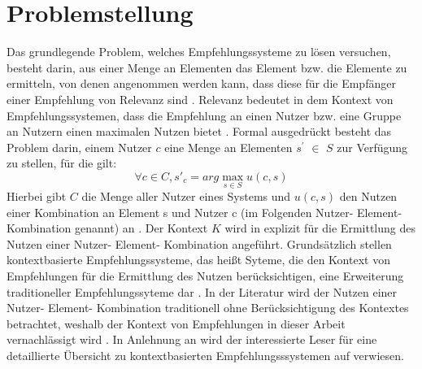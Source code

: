 \section{Problemstellung}
\label{ch:empfehlungssysteme:problemstellung}
Das grundlegende Problem, welches Empfehlungssysteme zu lösen versuchen, besteht darin, aus einer Menge an Elementen das Element bzw. die Elemente zu ermitteln, von denen angenommen werden kann, dass diese für die Empfänger einer Empfehlung von Relevanz sind \cite[S. 734f]{adomavicius:inproceedings}\cite[S. 76]{jannach:inproceedings}.
Relevanz bedeutet in dem Kontext von Empfehlungssystemen, dass die Empfehlung an einen Nutzer bzw. eine Gruppe an Nutzern einen maximalen Nutzen bietet \cite[S. 49]{adomavicius:inproceedings:2}\cite[S. 219]{lakiotaki:inproceedings}.
Formal ausgedrückt besteht das Problem darin, einem Nutzer $c$ eine Menge an Elementen $s^{'}$ $\in$ $S$ zur Verfügung zu stellen, für die gilt:
\begin{equation}\label{eq1}
    \forall c\in C,  s'_c = arg\max_{s \in S} u(c,s)
\end{equation}
Hierbei gibt $C$ die Menge aller Nutzer eines Systems und $u(c,s)$ den Nutzen einer Kombination an Element s und Nutzer c (im Folgenden Nutzer- Element- Kombination genannt) an \cite[S. 734f]{adomavicius:inproceedings}\cite[S. 219]{lakiotaki:inproceedings}.
Der Kontext $K$ wird in \textcite[S. 1]{klahold:book} explizit für die Ermittlung des Nutzen einer Nutzer- Element- Kombination angeführt.
Grundsätzlich stellen kontextbasierte Empfehlungssysteme, das heißt Syteme, die den Kontext von Empfehlungen für die Ermittlung des Nutzen berücksichtigen, eine Erweiterung traditioneller Empfehlungssyteme dar \cite[S. 744ff]{adomavicius:inproceedings}.
In der Literatur wird der Nutzen einer Nutzer- Element- Kombination traditionell ohne Berücksichtigung des Kontextes betrachtet, weshalb der Kontext von Empfehlungen in dieser Arbeit vernachlässigt wird \cite[S. 734f]{adomavicius:inproceedings}\cite[S. 219]{lakiotaki:inproceedings}\cite[S. 3]{jawaheer:article}.
In Anlehnung an \textcite[S. 3]{jawaheer:article} wird der interessierte Leser für eine detaillierte Übersicht zu kontextbasierten Empfehlungsssystemen auf \textcite[S. 191ff]{ricci:book} verwiesen.

